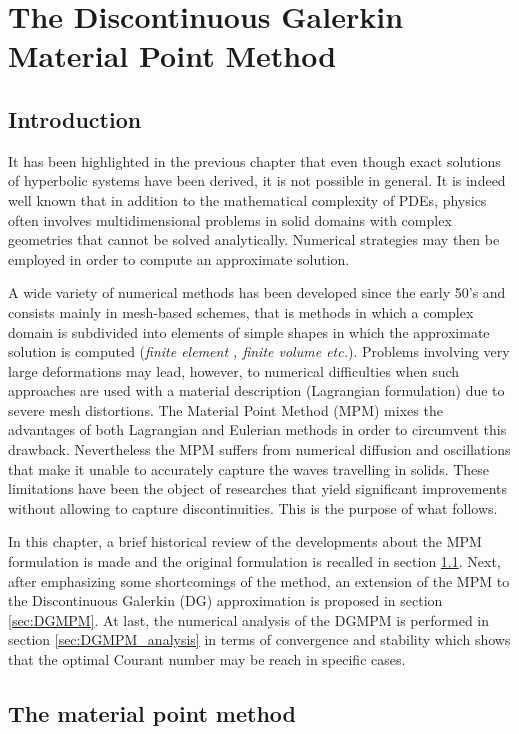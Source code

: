 \chapter{The Discontinuous Galerkin Material Point Method}

\section*{Introduction}
It has been highlighted in the previous chapter that even though exact solutions of hyperbolic systems have been derived, it is not possible in general. It is indeed well known that in addition to the mathematical complexity of PDEs, physics often involves multidimensional problems in solid domains with complex geometries that cannot be solved analytically. Numerical strategies may then be employed in order to compute an approximate solution.

A wide variety of numerical methods has been developed since the early 50's and consists mainly in mesh-based schemes, that is methods in which a complex domain is subdivided into elements of simple
shapes in which the approximate solution is computed (\textit{finite element \cite{Belytschko}, finite volume \cite{Leveque} etc.}). Problems involving very large deformations may lead, however, to numerical difficulties when such approaches are used with a material description (Lagrangian formulation) due to severe mesh distortions. The Material Point Method (MPM) \cite{Sulsky94} mixes the advantages of both Lagrangian and Eulerian methods in order to circumvent this drawback. Nevertheless the MPM suffers from numerical diffusion and oscillations that make it unable to accurately capture the waves travelling in solids. These limitations have been the object of researches that yield significant improvements without allowing to capture discontinuities. This is the purpose of what follows.

In this chapter, a brief historical review of the developments about the MPM formulation is made and the original formulation is recalled in section \ref{sec:MPM}. Next, after emphasizing some shortcomings of the method, an extension of the MPM to the Discontinuous Galerkin (DG) approximation is proposed in section \ref{sec:DGMPM}. At last, the numerical analysis of the DGMPM is performed in section \ref{sec:DGMPM_analysis} in terms of convergence and stability which shows that the optimal Courant number may be reach in specific cases.



\section{The material point method}
\label{sec:MPM}



